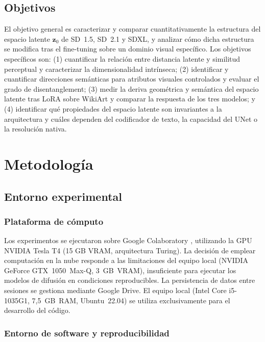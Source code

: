 \documentclass[12pt, a4paper, twoside]{book}
\newcommand{\z}{\mathbf{z}}
\begin{document}
\section{Objetivos}
\label{sec:objetivos}

El objetivo general es caracterizar y comparar cuantitativamente la estructura del espacio latente $\z_0$ de SD~1.5, SD~2.1 y SDXL, y analizar cómo dicha estructura se modifica tras el fine-tuning sobre un dominio visual específico. Los objetivos específicos son: (1) cuantificar la relación entre distancia latente y similitud perceptual y caracterizar la dimensionalidad intrínseca; (2) identificar y cuantificar direcciones semánticas para atributos visuales controlados y evaluar el grado de disentanglement; (3) medir la deriva geométrica y semántica del espacio latente tras LoRA sobre WikiArt y comparar la respuesta de los tres modelos; y (4) identificar qué propiedades del espacio latente son invariantes a la arquitectura y cuáles dependen del codificador de texto, la capacidad del UNet o la resolución nativa.

\chapter{Metodología}
\label{ch:metodos}

\section{Entorno experimental}
\label{sec:entorno}

\subsection{Plataforma de cómputo}

Los experimentos se ejecutaron sobre Google Colaboratory \citep{google2017colab}, utilizando la GPU NVIDIA Tesla T4 (15 GB VRAM, arquitectura Turing). La decisión de emplear computación en la nube responde a las limitaciones del equipo local (NVIDIA GeForce GTX~1050~Max-Q, 3~GB~VRAM), insuficiente para ejecutar los modelos de difusión en condiciones reproducibles. La persistencia de datos entre sesiones se gestiona mediante Google Drive. El equipo local (Intel Core i5-1035G1, 7,5~GB~RAM, Ubuntu~22.04) se utiliza exclusivamente para el desarrollo del código.

\subsection{Entorno de software y reproducibilidad}
\end{document}
